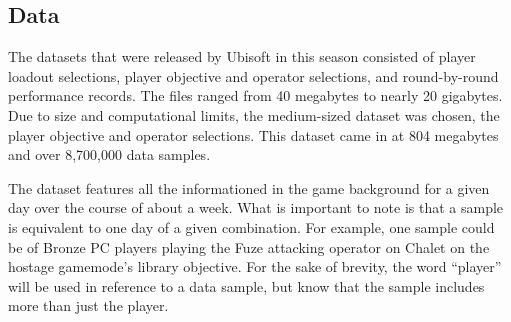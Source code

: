 \documentclass[12pt]{article}
\begin{document}
\newpage

\subsection{Data}
The datasets that were released by Ubisoft in this season consisted of player loadout selections, player objective and operator selections, and round-by-round performance records.
The files ranged from 40 megabytes to nearly 20 gigabytes.
Due to size and computational limits, the medium-sized dataset was chosen, the player objective and operator selections.
This dataset came in at 804 megabytes and over 8,700,000 data samples.

The dataset features all the informationed in the game background for a given day over the course of about a week.
What is important to note is that a sample is equivalent to one day of a given combination.
For example, one sample could be of Bronze PC players playing the Fuze attacking operator on Chalet on the hostage gamemode's library objective.
For the sake of brevity, the word ``player'' will be used in reference to a data sample, but know that the sample includes more than just the player.

\newpage
\end{document}
